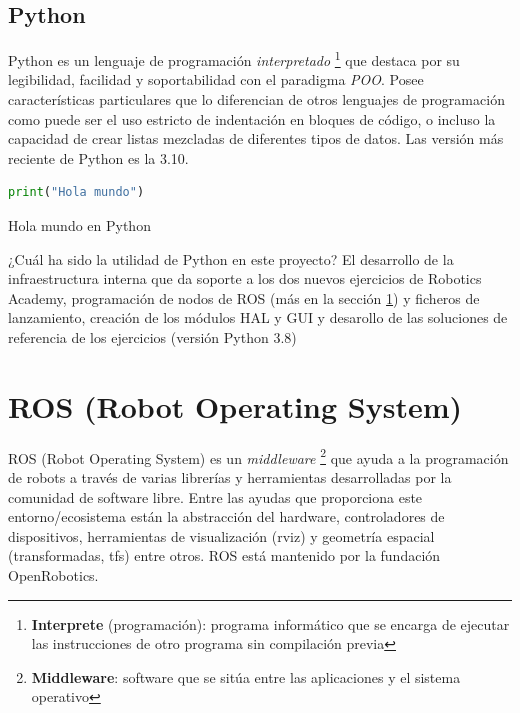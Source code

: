 \subsection{Python}
\label{subsec:python}

Python \cite{python_doc} es un lenguaje de programación \textit{interpretado} \footnote{\textbf{Interprete} (programación): programa informático que se encarga de ejecutar las instrucciones de otro programa sin compilación previa} que destaca por su legibilidad, facilidad y soportabilidad con el paradigma \textit{POO}. Posee características particulares que lo diferencian de otros lenguajes de programación como puede ser el uso estricto de indentación en bloques de código, o incluso la capacidad de crear listas mezcladas de diferentes tipos de datos. Las versión más reciente de Python es la 3.10.\\

\begin{code}[H]
\begin{lstlisting}[language=Python]
print("Hola mundo")
\end{lstlisting}
\caption[Hola mundo en Python]{Hola mundo en Python}
\label{cod:holamundo_python}
\end{code}

¿Cuál ha sido la utilidad de Python en este proyecto? El desarrollo de la infraestructura interna que da soporte a los dos nuevos ejercicios de Robotics Academy, programación de nodos de ROS (más en la sección \ref{sec:ros}) y ficheros de lanzamiento, creación de los módulos HAL y GUI y desarollo de las soluciones de referencia de los ejercicios (versión Python 3.8)\\




\section{ROS (Robot Operating System)}
\label{sec:ros}
ROS (Robot Operating System) \cite{ROS} es un \textit{middleware} \footnote{\textbf{Middleware}: software que se sitúa entre las aplicaciones y el sistema operativo} que ayuda a la programación de robots a través de varias librerías y herramientas desarrolladas por la comunidad de software libre. Entre las ayudas que proporciona este entorno/ecosistema están la abstracción del hardware, controladores de dispositivos, herramientas de visualización (rviz) y geometría espacial (transformadas, tfs) entre otros. ROS está mantenido por la fundación OpenRobotics.\\

